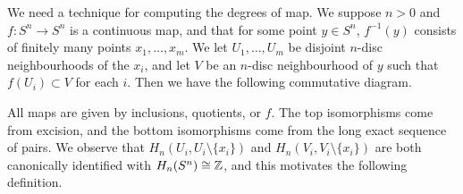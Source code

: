We need a technique for computing the degrees of map. We suppose $n > 0$ and $f: S^n \to S^n$ is a continuous map, and that for some point $y \in S^n$, $f^{-1}(y)$ consists of finitely many points $x_1, \ldots, x_m$. We let $U_1, \ldots, U_m$ be disjoint $n$-disc neighbourhoods of the $x_i$, and let $V$ be an $n$-disc neighbourhood of $y$ such that $f(U_i) \subset V$ for each $i$. Then we have the following commutative diagram. 

\begin{center}
  \scriptsize
\end{center}

All maps are given by inclusions, quotients, or $f$. The top isomorphisms come from excision, and the bottom isomorphisms come from the long exact sequence of pairs. We observe that $H_n(U_i, U_i \setminus \{x_i\})$ and $H_n(V_i, V_i \setminus \{x_i\})$ are both canonically identified with $H_n(S^n) \cong \mathbb{Z}$, and this motivates the following definition.

